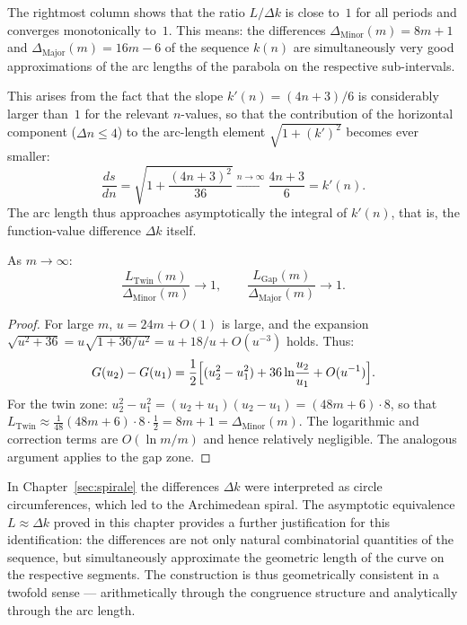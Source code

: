 \begin{tcolorbox}[
  title={Main observation: arc length $\approx$ difference value},
  colback=blue!3,
  colframe=blue!40!black,
  enhanced,
  breakable
]
The rightmost column shows that the ratio $L / \Delta k$ is close to~$1$
for all periods and converges monotonically to~$1$. This means: the
differences $\Delta_{\mathrm{Minor}}(m) = 8m+1$ and
$\Delta_{\mathrm{Major}}(m) = 16m-6$ of the sequence $k(n)$ are
simultaneously very good approximations of the arc lengths of the parabola
on the respective sub-intervals.

This arises from the fact that the slope $k'(n) = (4n+3)/6$ is considerably
larger than~$1$ for the relevant $n$-values, so that the contribution of the
horizontal component ($\Delta n \leq 4$) to the arc-length element
$\sqrt{1+(k')^2}$ becomes ever smaller:
\[
  \frac{ds}{dn} = \sqrt{1 + \frac{(4n+3)^2}{36}}
  \xrightarrow{n \to \infty} \frac{4n+3}{6} = k'(n).
\]
The arc length thus approaches asymptotically the integral of $k'(n)$,
that is, the function-value difference $\Delta k$ itself.
\end{tcolorbox}

\begin{proposition}
\label{prop:bl_aequivalenz}
As $m \to \infty$:
\[
  \frac{L_{\mathrm{Twin}}(m)}{\Delta_{\mathrm{Minor}}(m)} \to 1,
  \qquad
  \frac{L_{\mathrm{Gap}}(m)}{\Delta_{\mathrm{Major}}(m)} \to 1.
\]
\end{proposition}

\begin{proof}
For large $m$, $u = 24m + O(1)$ is large, and the expansion
$\sqrt{u^2+36} = u\sqrt{1+36/u^2} = u + 18/u + O(u^{-3})$ holds. Thus:
\[
  G(u_2) - G(u_1)
  = \frac{1}{2}\Bigl[(u_2^2 - u_1^2)
    + 36\ln\!\frac{u_2}{u_1}
    + O(u^{-1})\Bigr].
\]
For the twin zone: $u_2^2 - u_1^2 = (u_2+u_1)(u_2-u_1) = (48m+6)\cdot 8$,
so that $L_{\mathrm{Twin}} \approx \frac{1}{48}(48m+6)\cdot 8 \cdot \frac{1}{2}
= 8m + 1 = \Delta_{\mathrm{Minor}}(m)$.
The logarithmic and correction terms are $O(\ln m / m)$ and hence
relatively negligible. The analogous argument applies to the gap zone.
\end{proof}

\begin{remark}
In Chapter~\ref{sec:spirale} the differences $\Delta k$ were interpreted as
circle circumferences, which led to the Archimedean spiral. The asymptotic
equivalence $L \approx \Delta k$ proved in this chapter provides a
further justification for this identification: the differences are
not only natural combinatorial quantities of the sequence, but
simultaneously approximate the geometric length of the curve on the
respective segments. The construction is thus geometrically consistent
in a twofold sense --- arithmetically through the congruence structure
and analytically through the arc length.
\end{remark}
